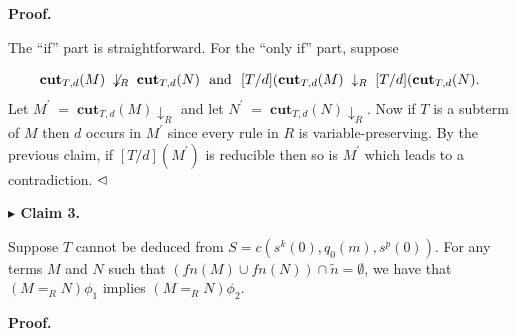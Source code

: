  
 
 
 
\par\medskip\noindent\textbf{Proof.}\par
 
 
The “if” part is straightforward. For the “only if” part, suppose\par
    \[\mathbf{cut}_{T,d}(M)\;\not\downarrow_{R}\;\mathbf{cut}_{T,d}(N)\leavevmode%
\nobreak\ \text{ and }\leavevmode\nobreak\ [T/d](\mathbf{cut}_{T,d}(M)\;%
\downarrow_{R}\;[T/d](\mathbf{cut}_{T,d}(N).\]    
Let $M^{\prime}\;=\;\mathbf{cut}_{T,d}(M)\!\downarrow_{R}$ and let $N^{\prime}\;=\;\mathbf{cut}_{T,d}(N)\!\downarrow_{R}$. Now if $T$ is a subterm of $M$ then $d$ occurs in $M^{\prime}$ since every rule in $R$ is variable-preserving. By the previous claim, if $[T/d](M^{\prime})$ is reducible then so is $M^{\prime}$ which leads to a contradiction. $\hfill\vartriangleleft$\par
 
 
 
\par\medskip\noindent\textbf{$\blacktriangleright$ Claim 3.}\par
 
 
Suppose $T$ cannot be deduced from $S=c(s^{k}(0),q_{0}(m),s^{p}(0))$. For any terms $M$ and $N$ such that $(\mathit{fn}(M)\cup\mathit{fn}(N))\cap\tilde{n}=\emptyset$, we have that $(M=_{R}N)\phi_{1}$ implies $(M=_{R}N)\phi_{2}$.\par
 
 
 
 
 
\par\medskip\noindent\textbf{Proof.}\par
 
 
